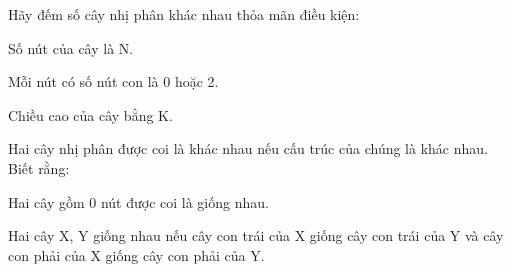 Hãy đếm số cây nhị phân khác nhau thỏa mãn điều kiện:  

   Số nút của cây là N.  

   Mỗi nút có số nút con là 0 hoặc 2.  

   Chiều cao của cây bằng K.  

   Hai cây nhị phân được coi là khác nhau nếu cấu trúc của chúng là khác nhau. Biết rằng:  

   Hai cây gồm 0 nút được coi là giống nhau.  

   Hai cây X, Y giống nhau nếu cây con trái của X giống cây con trái của Y và cây con phải của X giống cây con phải của Y.  

\